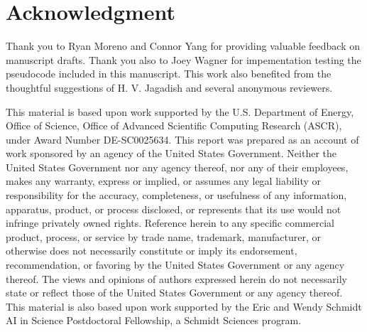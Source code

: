 \section*{Acknowledgment}

Thank you to Ryan Moreno and Connor Yang for providing valuable feedback on manuscript drafts.
Thank you also to Joey Wagner for impementation testing the pseudocode included in this manuscript.
This work also benefited from the thoughtful suggestions of H. V. Jagadish and several anonymous reviewers.

This material is based upon work supported by the U.S. Department of Energy, Office of Science, Office of Advanced Scientific Computing Research (ASCR), under Award Number DE-SC0025634.
This report was prepared as an account of work sponsored by an agency of the United States Government.
Neither the United States Government nor any agency thereof, nor any of their employees, makes any warranty, express or implied, or assumes any legal liability or responsibility for the accuracy, completeness, or usefulness of any information, apparatus, product, or process disclosed, or represents that its use would not infringe privately owned rights.
Reference herein to any specific commercial product, process, or service by trade name, trademark, manufacturer, or otherwise does not necessarily constitute or imply its endorsement, recommendation, or favoring by the United States Government or any agency thereof.
The views and opinions of authors expressed herein do not necessarily state or reflect those of the United States Government or any agency thereof.
This material is also based upon work supported by the Eric and Wendy Schmidt AI in Science Postdoctoral Fellowship, a Schmidt Sciences program.
